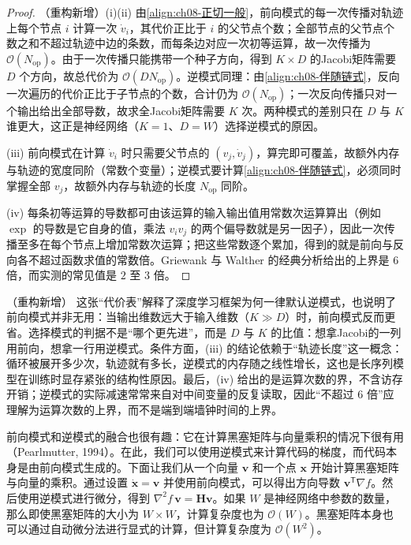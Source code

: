 \documentclass[../../main.tex]{subfiles}
\begin{document}
\begin{proof}
（重构新增）(i)(ii) 由\eqref{align:ch08-正切一般}，前向模式的每一次传播对轨迹上每个节点 $i$ 计算一次 $\dot{v}_i$，其代价正比于 $i$ 的父节点个数；全部节点的父节点个数之和不超过轨迹中边的条数，而每条边对应一次初等运算，故一次传播为 $\mathcal{O}(N_{\mathrm{op}})$。由于一次传播只能携带一个种子方向，得到 $K\times D$ 的Jacobi矩阵需要 $D$ 个方向，故总代价为 $\mathcal{O}(DN_{\mathrm{op}})$。逆模式同理：由\eqref{align:ch08-伴随链式}，反向一次遍历的代价正比于子节点的个数，合计仍为 $\mathcal{O}(N_{\mathrm{op}})$；一次反向传播只对一个输出给出全部导数，故求全Jacobi矩阵需要 $K$ 次。两种模式的差别只在 $D$ 与 $K$ 谁更大，这正是神经网络（$K=1$、$D=W$）选择逆模式的原因。

(iii) 前向模式在计算 $\dot{v}_i$ 时只需要父节点的 $(v_j,\dot{v}_j)$，算完即可覆盖，故额外内存与轨迹的宽度同阶（常数个变量）；逆模式要计算\eqref{align:ch08-伴随链式}，必须同时掌握全部 $v_j$，故额外内存与轨迹的长度 $N_{\mathrm{op}}$ 同阶。

(iv) 每条初等运算的导数都可由该运算的输入输出值用常数次运算算出（例如 $\exp$ 的导数是它自身的值，乘法 $v_iv_j$ 的两个偏导数就是另一因子），因此一次传播至多在每个节点上增加常数次运算；把这些常数逐个累加，得到的就是前向与反向各不超过函数求值的常数倍。Griewank 与 Walther 的经典分析给出的上界是 $6$ 倍，而实测的常见值是 $2$ 至 $3$ 倍。
\end{proof}

\begin{remark}（重构新增）
这张“代价表”解释了深度学习框架为何一律默认逆模式，也说明了前向模式并非无用：当输出维数远大于输入维数（$K\gg D$）时，前向模式反而更省。选择模式的判据不是“哪个更先进”，而是 $D$ 与 $K$ 的比值：想拿Jacobi的一列用前向，想拿一行用逆模式。条件方面，(iii) 的结论依赖于“轨迹长度”这一概念：循环被展开多少次，轨迹就有多长，逆模式的内存随之线性增长，这也是长序列模型在训练时显存紧张的结构性原因。最后，(iv) 给出的是运算次数的界，不含访存开销；逆模式的实际减速常常来自对中间变量的反复读取，因此“不超过 6 倍”应理解为运算次数的上界，而不是端到端墙钟时间的上界。
\end{remark}

前向模式和逆模式的融合也很有趣：它在计算黑塞矩阵与向量乘积的情况下很有用（Pearlmutter, 1994）。在此，我们可以使用逆模式来计算代码的梯度，而代码本身是由前向模式生成的。下面让我们从一个向量 $\mathbf{v}$ 和一个点 $\mathbf{x}$ 开始计算黑塞矩阵与向量的乘积。通过设置 $\dot{\mathbf{x}}=\mathbf{v}$ 并使用前向模式，可以得出方向导数 $\mathbf{v}^{\mathsf T}\nabla f$。然后使用逆模式进行微分，得到 $\nabla^{2}f\,\mathbf{v}=\mathbf{H}\mathbf{v}$。如果 $W$ 是神经网络中参数的数量，那么即使黑塞矩阵的大小为 $W\times W$，计算复杂度也为 $\mathcal{O}(W)$。黑塞矩阵本身也可以通过自动微分法进行显式的计算，但计算复杂度为 $\mathcal{O}(W^{2})$。
\end{document}
